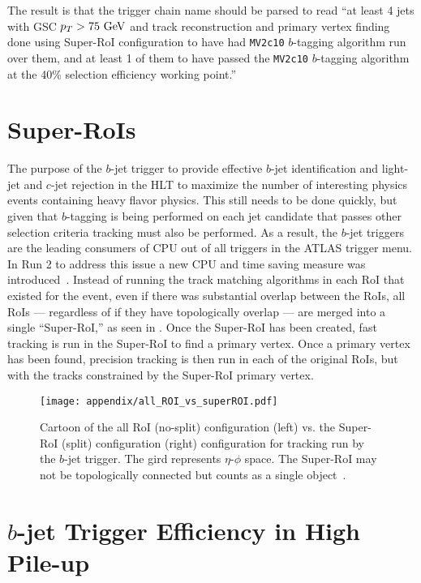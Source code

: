 The result is that the trigger chain name should be parsed to read ``at least 4 jets with GSC $p_{T} > 75~\mathrm{GeV}$ and track reconstruction and primary vertex finding done using Super-RoI configuration to have had \texttt{MV2c10} $b$-tagging algorithm run over them, and at least 1 of them to have passed the \texttt{MV2c10} $b$-tagging algorithm at the 40\% selection efficiency working point.''


\section{Super-RoIs}\label{section:super-RoI}

The purpose of the $b$-jet trigger to provide effective $b$-jet identification and light-jet and $c$-jet rejection in the \gls{HLT} to maximize the number of interesting physics events containing heavy flavor physics.
This still needs to be done quickly, but given that $b$-tagging is being performed on each jet candidate that passes other selection criteria tracking must also be performed.
As a result, the $b$-jet triggers are the leading consumers of CPU out of all triggers in the ATLAS trigger menu.
In Run 2 to address this issue a new CPU and time saving measure was introduced~\cite{Hetherly:2313140}.
Instead of running the track matching algorithms in each \gls{RoI} that existed for the event, even if there was substantial overlap between the RoIs, all RoIs --- regardless of if they have topologically overlap --- are merged into a single ``Super-RoI,'' as seen in .
Once the Super-RoI has been created, fast tracking is run in the Super-RoI to find a primary vertex.
Once a primary vertex has been found, precision tracking is then run in each of the original RoIs, but with the tracks constrained by the Super-RoI primary vertex.

\begin{figure}[htbp]
 \centering
 \texttt{[image: appendix/all\_ROI\_vs\_superROI.pdf]}
 \caption[Cartoon of the all RoI vs. the Super-RoI configuration for tracking run by the $b$-jet trigger.]{%
  Cartoon of the all RoI (no-split) configuration (left) vs. the Super-RoI (split) configuration (right) configuration for tracking run by the $b$-jet trigger.
  The gird represents $\eta$-$\phi$ space.
  The Super-RoI may not be topologically connected but counts as a single object~\cite{Hetherly:2313140}.}
 \label{fig:all_ROI_vs_superROI}
\end{figure}

\section{$b$-jet Trigger Efficiency in High Pile-up}\label{section:BJetTrig_efficiency}

